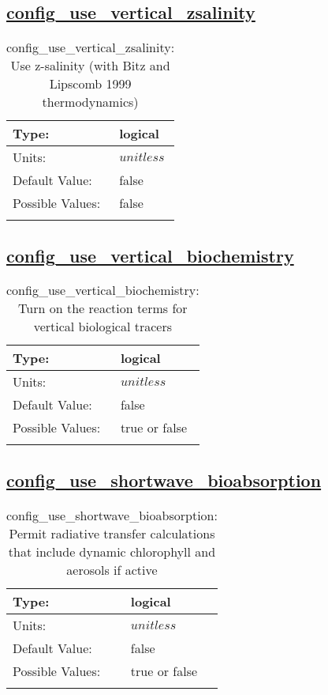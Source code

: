 \subsection[config\_use\_vertical\_zsalinity]{\hyperref[sec:nm_tab_biogeochemistry]{config\_use\_vertical\_zsalinity}}
\label{subsec:nm_sec_config_use_vertical_zsalinity}
\begin{center}
\begin{longtable}{| p{2.0in} || p{4.0in} |}
    \hline
    Type: & logical \\
    \hline
    Units: & $unitless$ \\
    \hline
    Default Value: & false \\
    \hline
    Possible Values: & false \\
    \hline
    \caption{config\_use\_vertical\_zsalinity: Use z-salinity (with Bitz and Lipscomb 1999 thermodynamics)}
\end{longtable}
\end{center}
\subsection[config\_use\_vertical\_biochemistry]{\hyperref[sec:nm_tab_biogeochemistry]{config\_use\_vertical\_biochemistry}}
\label{subsec:nm_sec_config_use_vertical_biochemistry}
\begin{center}
\begin{longtable}{| p{2.0in} || p{4.0in} |}
    \hline
    Type: & logical \\
    \hline
    Units: & $unitless$ \\
    \hline
    Default Value: & false \\
    \hline
    Possible Values: & true or false \\
    \hline
    \caption{config\_use\_vertical\_biochemistry: Turn on the reaction terms for vertical biological tracers}
\end{longtable}
\end{center}
\subsection[config\_use\_shortwave\_bioabsorption]{\hyperref[sec:nm_tab_biogeochemistry]{config\_use\_shortwave\_bioabsorption}}
\label{subsec:nm_sec_config_use_shortwave_bioabsorption}
\begin{center}
\begin{longtable}{| p{2.0in} || p{4.0in} |}
    \hline
    Type: & logical \\
    \hline
    Units: & $unitless$ \\
    \hline
    Default Value: & false \\
    \hline
    Possible Values: & true or false \\
    \hline
    \caption{config\_use\_shortwave\_bioabsorption: Permit radiative transfer calculations that include dynamic chlorophyll and aerosols if active}
\end{longtable}
\end{center}
